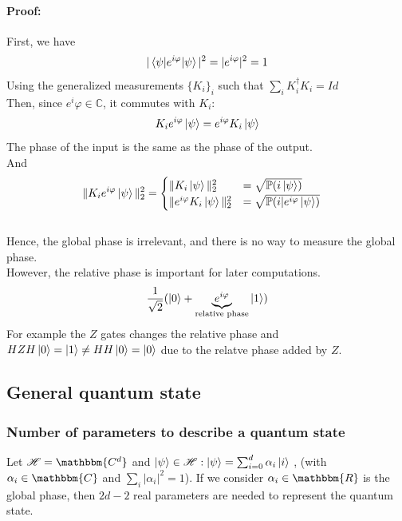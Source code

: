 \documentclass{article}
\begin{document}
\paragraph{Proof: }
First, we have
\begin{equation}
    |\braket{\psi|e^{i\varphi}|\psi}|^2 = |e^{i\varphi}|^2 = 1
\end{equation}
Using the generalized measurements $\{K_i\}_i$ such that $\sum_i K_i^\dagger K_i
= Id$ \\\noindent
Then, since $e^i\varphi \in \mathbb{C}$, it commutes with $K_i$:
\begin{equation}
    K_ie^{i\varphi}\ket{\psi} = e^{i\varphi}K_i\ket{\psi}
\end{equation}
\noindent
The phase of the input is the same as the phase of the output. \\\noindent And
\begin{equation}
    \begin{aligned}
        \|K_ie^{i\varphi}\ket{\psi}\|^2_2
            & =\begin{cases}
               \| K_i \ket{\psi} \|_2^2 & =  \sqrt{ \mathbb{P}(i\ket{\psi})} \\
               \|e^{i\varphi} K_i\ket{\psi}\|_2^2 & =  \sqrt{\mathbb{P}(i|e^{i\varphi}\ket{\psi})}
            \end{cases}
    \end{aligned}
\end{equation}
\\\noindent Hence, the global phase is irrelevant, and there is no way to
measure the global phase. \\\noindent However, the relative phase is important
for later computations.
\begin{equation}
    \frac{1}{\sqrt{2}}(\ket{0}+\underbrace{e^{i\varphi}}_{\text{relative phase}}\ket{1})
\end{equation}
For example the $Z$ gates changes the relative phase and $HZH\ket{0} = \ket{1}\neq
HH\ket{0} = \ket{0}$ due to the relatve phase added by $Z$.

\subsection{General quantum state}
\subsubsection*{Number of parameters to describe a quantum state}
Let $\mathscr{H} = \mathbbm{C^d}$ and $\ket{\psi} \in \mathscr{H}: \ket{\psi} =
\sum_{i=0}^d \alpha_i \ket{i}$ , (with $\alpha_i \in \mathbbm{C}$ and $\sum_i
|\alpha_i|^2=1$). If we consider $\alpha_i \in \mathbbm{R}$ is the global phase,
then $2d-2$ real parameters are needed to represent the quantum state.
\end{document}
